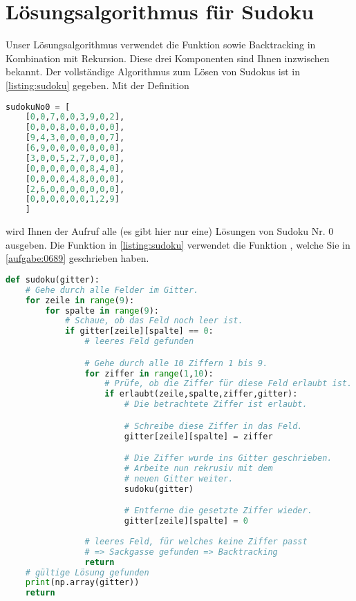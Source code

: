 \clearpage


\section{Lösungsalgorithmus für Sudoku}
Unser Lösungsalgorithmus verwendet die Funktion  sowie Backtracking in Kombination mit Rekursion. Diese drei Komponenten sind Ihnen inzwischen bekannt. Der vollständige Algorithmus zum Lösen von Sudokus ist in \cref{listing:sudoku} gegeben. Mit der Definition
\begin{lstlisting}[language=Python,caption=Abspeichern von Sudoku-Gittern in Python,numbers=none]
  sudokuNo0 = [
    [0,0,7,0,0,3,9,0,2],
    [0,0,0,8,0,0,0,0,0],
    [9,4,3,0,0,0,0,0,7],
    [6,9,0,0,0,0,0,0,0],
    [3,0,0,5,2,7,0,0,0],
    [0,0,0,0,0,0,8,4,0],
    [0,0,0,0,4,8,0,0,0],
    [2,6,0,0,0,0,0,0,0],
    [0,0,0,0,0,0,1,2,9]
    ]
\end{lstlisting}
wird Ihnen der Aufruf  alle (es gibt hier nur eine) Lösungen von Sudoku Nr. 0 ausgeben. Die Funktion in \cref{listing:sudoku} verwendet die Funktion , welche Sie in \cref{aufgabe:0689} geschrieben haben.

\lstset{style=mystyle}
\begin{lstlisting}[language=Python,caption=Implementation der Funktion \pythoninline{sudoku},label=listing:sudoku]
def sudoku(gitter):
	# Gehe durch alle Felder im Gitter.
	for zeile in range(9):
		for spalte in range(9):
			# Schaue, ob das Feld noch leer ist.
			if gitter[zeile][spalte] == 0:
				# leeres Feld gefunden

				# Gehe durch alle 10 Ziffern 1 bis 9.
				for ziffer in range(1,10):
					# Prüfe, ob die Ziffer für diese Feld erlaubt ist.
					if erlaubt(zeile,spalte,ziffer,gitter):
						# Die betrachtete Ziffer ist erlaubt.

						# Schreibe diese Ziffer in das Feld.
						gitter[zeile][spalte] = ziffer

						# Die Ziffer wurde ins Gitter geschrieben.
						# Arbeite nun rekrusiv mit dem
						# neuen Gitter weiter.
						sudoku(gitter)

						# Entferne die gesetzte Ziffer wieder.
						gitter[zeile][spalte] = 0
						
				# leeres Feld, für welches keine Ziffer passt
				# => Sackgasse gefunden => Backtracking
				return
	# gültige Lösung gefunden
	print(np.array(gitter))
	return
\end{lstlisting} 

